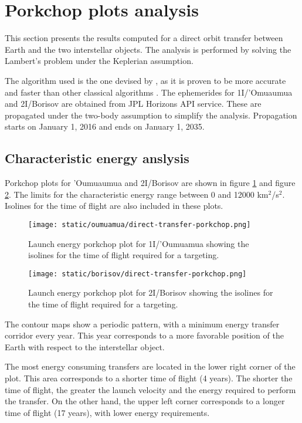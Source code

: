 \section{Porkchop plots analysis}

This section presents the results computed for a direct orbit transfer between
Earth and the two interstellar objects. The analysis is performed by solving the
Lambert's problem under the Keplerian assumption.

The algorithm used is the one devised by \cite{izzo2015}, as it is proven to be
more accurate and faster than other classical algorithms \cite{martinez2021}.
The ephemerides for 1I/'Omuaumua and 2I/Borisov are obtained from JPL Horizons
API service. These are propagated under the two-body assumption to simplify the
analysis. Propagation starts on January 1, 2016 and ends on January 1, 2035.

\subsection{Characteristic energy anslysis}

Porkchop plots for 'Oumuaumua and 2I/Borisov are shown in figure
\ref{fig:oumuamua-direct-transfer-porkchop} and figure
\ref{fig:borisov-direct-transfer-porkchop}. The limits for the characteristic
energy range between 0 and 12000 km$^2$/s$^2$. Isolines for the time of flight
are also included in these plots.

\newpage
\begin{figure}[H]
  \centering
  \texttt{[image: static/oumuamua/direct-transfer-porkchop.png]}
  \caption{Launch energy porkchop plot for 1I/'Oumuamua showing the isolines for
    the time of flight required for a targeting.}
  \label{fig:oumuamua-direct-transfer-porkchop}
\end{figure}
\begin{figure}[H]
  \centering
  \texttt{[image: static/borisov/direct-transfer-porkchop.png]}
  \caption{Launch energy porkchop plot for 2I/Borisov showing the isolines for
    the time of flight required for a targeting.}
  \label{fig:borisov-direct-transfer-porkchop}
\end{figure}
\newpage

The contour maps show a periodic pattern, with a minimum energy transfer
corridor every year. This year corresponds to a more favorable position of the
Earth with respect to the interstellar object.

The most energy consuming transfers are located in the lower right corner of the
plot. This area corresponds to a shorter time of flight (4 years). The shorter
the time of flight, the greater the launch velocity and the energy required to
perform the transfer. On the other hand, the upper left corner corresponds to a
longer time of flight (17 years), with lower energy requirements.


